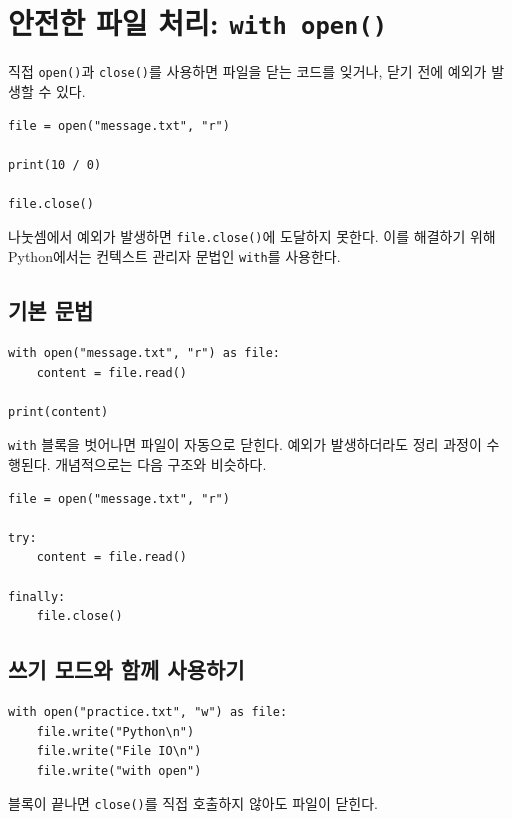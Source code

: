 \documentclass[11pt,a4paper]{article}
\begin{document}
\section{안전한 파일 처리: \texttt{with open()}}

직접 \texttt{open()}과 \texttt{close()}를 사용하면 파일을 닫는 코드를 잊거나, 닫기 전에 예외가 발생할 수 있다.

\begin{lstlisting}
file = open("message.txt", "r")

print(10 / 0)

file.close()
\end{lstlisting}

나눗셈에서 예외가 발생하면 \texttt{file.close()}에 도달하지 못한다. 이를 해결하기 위해 Python에서는 컨텍스트 관리자 문법인 \texttt{with}를 사용한다.

\subsection{기본 문법}

\begin{lstlisting}
with open("message.txt", "r") as file:
    content = file.read()

print(content)
\end{lstlisting}

\texttt{with} 블록을 벗어나면 파일이 자동으로 닫힌다. 예외가 발생하더라도 정리 과정이 수행된다. 개념적으로는 다음 구조와 비슷하다.

\begin{lstlisting}
file = open("message.txt", "r")

try:
    content = file.read()

finally:
    file.close()
\end{lstlisting}

\subsection{쓰기 모드와 함께 사용하기}

\begin{lstlisting}
with open("practice.txt", "w") as file:
    file.write("Python\n")
    file.write("File IO\n")
    file.write("with open")
\end{lstlisting}

블록이 끝나면 \texttt{close()}를 직접 호출하지 않아도 파일이 닫힌다.
\end{document}

